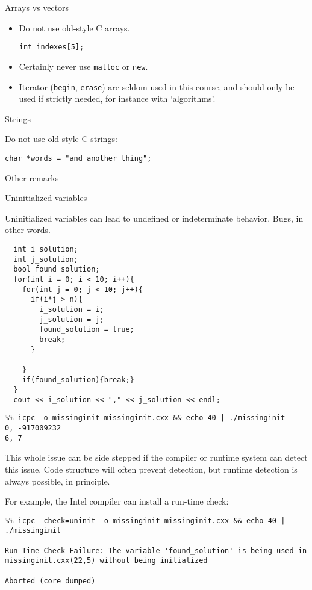  {Arrays vs vectors}

\begin{itemize}
\item Do not use old-style C arrays.
\begin{lstlisting}
int indexes[5];    
\end{lstlisting}
\item Certainly never use \lstinline{malloc} or \lstinline{new}.
\item Iterator (\lstinline{begin}, \lstinline{erase}) are
  seldom used in this course, and should only be used if strictly needed,
  for instance with `algorithms'.
\end{itemize}

 {Strings}

Do not use old-style C strings:
\begin{lstlisting}
char *words = "and another thing";
\end{lstlisting}

 {Other remarks}

 {Uninitialized variables}

Uninitialized variables can lead to undefined or indeterminate behavior.
Bugs, in other words.

\lstset{language=C++}
\begin{lstlisting}
  int i_solution;
  int j_solution;
  bool found_solution;
  for(int i = 0; i < 10; i++){
    for(int j = 0; j < 10; j++){
      if(i*j > n){
        i_solution = i;
        j_solution = j;
        found_solution = true;
        break;
      }

    }
    if(found_solution){break;}
  }
  cout << i_solution << "," << j_solution << endl;
\end{lstlisting}

\begin{verbatim}
%% icpc -o missinginit missinginit.cxx && echo 40 | ./missinginit
0, -917009232
6, 7
\end{verbatim}

This whole issue can be side stepped if the compiler or runtime system
can detect this issue.
Code structure will often prevent detection, 
but runtime detection is always possible, in principle.

For example, the Intel compiler can install a run-time check:

\begin{verbatim}
%% icpc -check=uninit -o missinginit missinginit.cxx && echo 40 | ./missinginit

Run-Time Check Failure: The variable 'found_solution' is being used in missinginit.cxx(22,5) without being initialized

Aborted (core dumped)
\end{verbatim}

